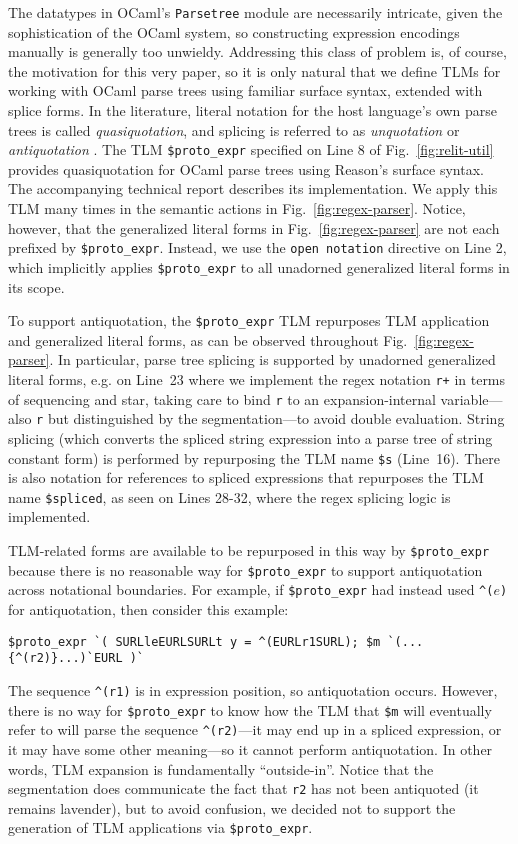 \documentclass[acmsmall]{acmart}
\newcommand{\li}[1]{\lstinline[basicstyle=\ttfamily\fontsize{9pt}{1em}\selectfont]{#1}}
\begin{document}
The datatypes in OCaml's \li{Parsetree} module are necessarily intricate, given the sophistication of the OCaml system, so constructing expression encodings manually is generally too unwieldy. Addressing this class of problem is, of course, the motivation for this very paper, so it is only natural that we define TLMs  for working with OCaml parse trees using familiar surface syntax, extended with splice forms. In the literature, literal notation for the host language's own parse trees is called \emph{quasiquotation}, and splicing is referred to as \emph{unquotation} or \emph{antiquotation} \cite{Bawd99a,shabalin2013quasiquotes,mainland2007s}. The TLM \li{$proto_expr}  specified on Line 8 of Fig.~\ref{fig:relit-util} provides quasiquotation for OCaml parse trees using Reason's surface syntax. The accompanying technical report describes its implementation. We apply this TLM many times in the semantic actions in Fig.~\ref{fig:regex-parser}. Notice, however, that the generalized literal forms in Fig.~\ref{fig:regex-parser} are not each prefixed by \li{$proto_expr}. Instead, we use the \li{open notation} directive on Line 2, which implicitly applies \li{$proto_expr} to all unadorned generalized literal forms in its scope. 

To support antiquotation, the \li{$proto_expr} TLM repurposes TLM application and generalized literal forms, as can be observed throughout Fig.~\ref{fig:regex-parser}. In particular, parse tree splicing is supported by unadorned generalized literal forms, e.g. on Line~23 where we implement the regex notation \li{r+} in terms of sequencing and star, taking care to bind \li{r} to an expansion-internal variable---also \li{r} but distinguished by the segmentation---to avoid double evaluation. String splicing (which converts the spliced string expression into a parse tree of string constant form) is performed by repurposing the TLM name \li{$s} (Line~16). There is also notation for references to spliced expressions that repurposes the TLM name \li{$spliced}, as seen on Lines 28-32, where the regex splicing logic is implemented. 

TLM-related forms are available to be repurposed in this way by \li{$proto_expr} because there is no reasonable way for \li{$proto_expr} to support antiquotation across notational boundaries. For example, if \li{$proto_expr} had instead used \li{^(}$e$\li{)} for antiquotation, then consider this example:
\begin{lstlisting}[numbers=none]
  $proto_expr `( SURLleEURLSURLt y = ^(EURLr1SURL); $m `(...{^(r2)}...)`EURL )`
\end{lstlisting}
The sequence \li{^(r1)} is in expression position, so antiquotation occurs. However, there is no way for \li{$proto_expr} to know how the TLM that \li{$m} will eventually refer to will parse the sequence \li{^(r2)}---it may end up in a spliced expression, or it may have some other meaning---so it cannot perform antiquotation. In other words, TLM expansion is fundamentally ``outside-in''.  Notice that the segmentation does communicate the fact that \li{r2} has not been antiquoted (it remains lavender), but to avoid confusion, we decided not to support the generation of TLM applications via \li{$proto_expr}. 
\end{document}
